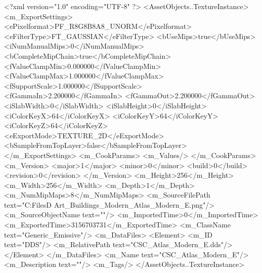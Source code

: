 <?xml version="1.0" encoding="UTF-8" ?>
<AssetObjects..TextureInstance>
	<m_ExportSettings>
		<ePixelformat>PF_R8G8B8A8_UNORM</ePixelformat>
		<eFilterType>FT_GAUSSIAN</eFilterType>
		<bUseMips>true</bUseMips>
		<iNumManualMips>0</iNumManualMips>
		<bCompleteMipChain>true</bCompleteMipChain>
		<fValueClampMin>0.000000</fValueClampMin>
		<fValueClampMax>1.000000</fValueClampMax>
		<fSupportScale>1.000000</fSupportScale>
		<fGammaIn>2.200000</fGammaIn>
		<fGammaOut>2.200000</fGammaOut>
		<iSlabWidth>0</iSlabWidth>
		<iSlabHeight>0</iSlabHeight>
		<iColorKeyX>64</iColorKeyX>
		<iColorKeyY>64</iColorKeyY>
		<iColorKeyZ>64</iColorKeyZ>
		<eExportMode>TEXTURE_2D</eExportMode>
		<bSampleFromTopLayer>false</bSampleFromTopLayer>
	</m_ExportSettings>
	<m_CookParams>
		<m_Values/>
	</m_CookParams>
	<m_Version>
		<major>1</major>
		<minor>0</minor>
		<build>0</build>
		<revision>0</revision>
	</m_Version>
	<m_Height>256</m_Height>
	<m_Width>256</m_Width>
	<m_Depth>1</m_Depth>
	<m_NumMipMaps>8</m_NumMipMaps>
	<m_SourceFilePath text="C:\Users\Shadow\Desktop\Working Files\3D Art\Textures\CSC_Buildings_Modern\Current\textures\CSC_Atlas_Modern_E.png"/>
	<m_SourceObjectName text=""/>
	<m_ImportedTime>0</m_ImportedTime>
	<m_ExportedTime>3156703731</m_ExportedTime>
	<m_ClassName text="Generic_Emissive"/>
	<m_DataFiles>
		<Element>
			<m_ID text="DDS"/>
			<m_RelativePath text="CSC_Atlas_Modern_E.dds"/>
		</Element>
	</m_DataFiles>
	<m_Name text="CSC_Atlas_Modern_E"/>
	<m_Description text=""/>
	<m_Tags/>
</AssetObjects..TextureInstance>

